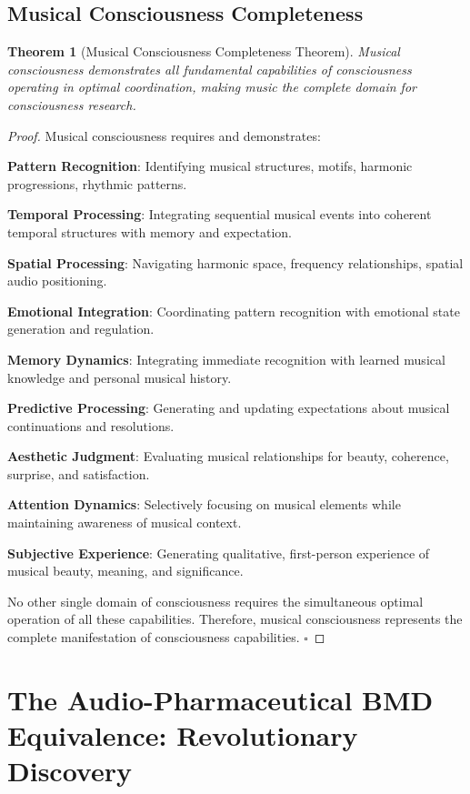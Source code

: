 \documentclass[12pt,a4paper]{article}
\newtheorem{theorem}{Theorem}[section]
\begin{document}
\subsection{Musical Consciousness Completeness}

\begin{theorem}[Musical Consciousness Completeness Theorem]
Musical consciousness demonstrates all fundamental capabilities of consciousness operating in optimal coordination, making music the complete domain for consciousness research.
\end{theorem}

\begin{proof}
Musical consciousness requires and demonstrates:

\textbf{Pattern Recognition}: Identifying musical structures, motifs, harmonic progressions, rhythmic patterns.

\textbf{Temporal Processing}: Integrating sequential musical events into coherent temporal structures with memory and expectation.

\textbf{Spatial Processing}: Navigating harmonic space, frequency relationships, spatial audio positioning.

\textbf{Emotional Integration}: Coordinating pattern recognition with emotional state generation and regulation.

\textbf{Memory Dynamics}: Integrating immediate recognition with learned musical knowledge and personal musical history.

\textbf{Predictive Processing}: Generating and updating expectations about musical continuations and resolutions.

\textbf{Aesthetic Judgment}: Evaluating musical relationships for beauty, coherence, surprise, and satisfaction.

\textbf{Attention Dynamics}: Selectively focusing on musical elements while maintaining awareness of musical context.

\textbf{Subjective Experience}: Generating qualitative, first-person experience of musical beauty, meaning, and significance.

No other single domain of consciousness requires the simultaneous optimal operation of all these capabilities. Therefore, musical consciousness represents the complete manifestation of consciousness capabilities. $\square$
\end{proof}

\section{The Audio-Pharmaceutical BMD Equivalence: Revolutionary Discovery}
\end{document}
